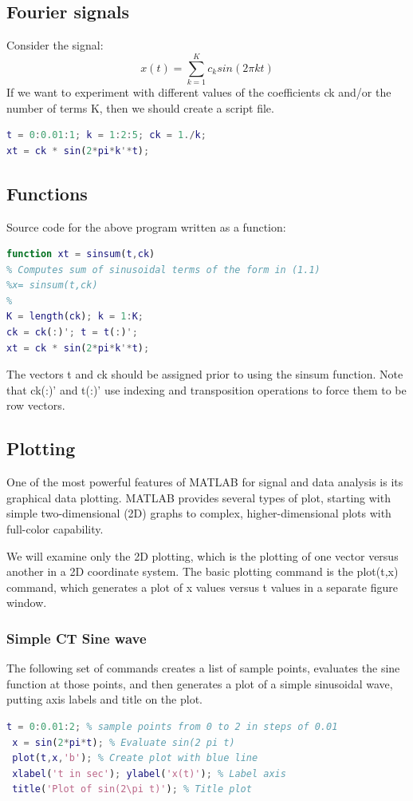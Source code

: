\documentclass{article}
\begin{document}
\subsection{Fourier signals}
Consider the signal: \\
\[
x(t) = \sum_{k=1}^{K}c_{k}sin(2\pi kt )
\]
If we want to experiment with different values of the coefficients ck and/or
the number of terms K, then we should create a script file.
\begin{lstlisting}[language=MATLAB]
t = 0:0.01:1; k = 1:2:5; ck = 1./k;
xt = ck * sin(2*pi*k'*t);    
\end{lstlisting}

\subsection{Functions}
Source code for the above program written as a function: \\
\begin{lstlisting}[language=MATLAB]
function xt = sinsum(t,ck)
% Computes sum of sinusoidal terms of the form in (1.1)
%x= sinsum(t,ck)
%
K = length(ck); k = 1:K;
ck = ck(:)'; t = t(:)';
xt = ck * sin(2*pi*k'*t);    
\end{lstlisting}
The vectors t and ck should be assigned prior to using the sinsum
function. Note that ck(:)' and t(:)' use indexing and transposition
operations to force them to be row vectors. 

\subsection{Plotting}
One of the most powerful features of MATLAB for signal and data analysis
is its graphical data plotting. MATLAB provides several types of plot,
starting with simple two-dimensional (2D) graphs to complex, higher-dimensional plots with full-color capability. 

We will examine only the 2D 
plotting, which is the plotting of one vector versus another in a 2D coordinate system. The basic plotting command is the plot(t,x) command,
which generates a plot of x values versus t values in a separate figure
window.

\subsubsection{Simple CT Sine wave}
The following set of commands creates a list of sample points, evaluates the sine function at those points, and then generates a plot of a
simple sinusoidal wave, putting axis labels and title on the plot.
\begin{lstlisting}[language=MATLAB]
 t = 0:0.01:2; % sample points from 0 to 2 in steps of 0.01
 x = sin(2*pi*t); % Evaluate sin(2 pi t)
 plot(t,x,'b'); % Create plot with blue line
 xlabel('t in sec'); ylabel('x(t)'); % Label axis
 title('Plot of sin(2\pi t)'); % Title plot    
\end{lstlisting}
\end{document}

